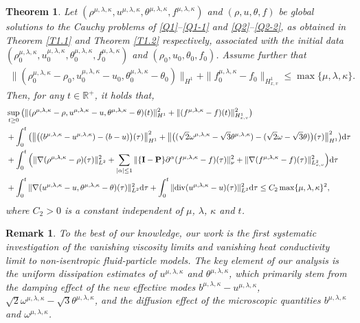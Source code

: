 \documentclass[reqno,11pt]{amsart}
\theoremstyle{plain}
\newtheorem{thm}{Theorem}[section]
\newtheorem{rem}{Remark}[section]
\numberwithin{equation}{section}
\begin{document}
\begin{thm}\label{T1.3}
Let $(\rho^{\mu,\lambda,\kappa}, u^{\mu,\lambda,\kappa}, \theta^{\mu,\lambda,\kappa}, 
f^{\mu,\lambda,\kappa})$ and $(\rho, u, \theta, f)$ 
be global solutions to the Cauchy problems of \eqref{Q1}--\eqref{Q1-1} and \eqref{Q2}--\eqref{Q2-2}, 
as obtained in
 Theorem \ref{T1.1} and Theorem \ref{T1.2}  respectively, associated with the initial data 
 $(\rho_0^{\mu,\lambda,\kappa}, 
 u_0^{\mu,\lambda,\kappa}, \theta_0^{\mu,
\lambda,\kappa}, f_0^{\mu,\lambda,\kappa})$ and $(\rho_0, u_0, \theta_0, f_0)$.
 Assume further that 
\begin{align}\nonumber %
\|(\rho_0^{\mu,\lambda,\kappa}-\rho_0,u_0^{\mu,\lambda,\kappa}-u_0,
\theta_0^{\mu,\lambda,\kappa}-\theta_0)\|_{H^1}+\|f_0^{\mu,\lambda,\kappa}-f_0\|_{H_{x,v}^1}\leq 
 \max\{\mu,\lambda,\kappa\}.
\end{align}
Then, for any $t\in \mathbb{R}^{+} $, it holds that,
\begin{align}\label{c2}
&\sup_{t\geq 0}\big(\|(\rho^ {\mu,\lambda,\kappa}-\rho,u^ {\mu,\lambda,\kappa}-u,
\theta^ {\mu,\lambda,\kappa}-\theta)(t)\|_{H^1}^2
+\|(f^ {\mu,\lambda,\kappa}-f)(t)\|_{H_{x,v}^1}^2\big)\nonumber\\
& +\int_0^t \big(\big\|\big((b^{\mu,\lambda,\kappa}-u^{\mu,\lambda,\kappa})-(b-u)\big)(\tau)\big\|_{H^1}^2 
 + \big\|\big((\sqrt{2}\omega^{\mu,\lambda,\kappa}-\sqrt{3}\theta^{\mu,\lambda,\kappa})
-(\sqrt{2}\omega-\sqrt{3}\theta)\big)(\tau)\big\|_{H^1}^2 \big){\rm d}\tau \nonumber\\
& +\int_0^t\Big( \|\nabla(\rho^{\mu,\lambda,\kappa}-\rho)(\tau)\|_{L^2}^2
+ \sum_{|\alpha|\leq 1}\|\{\mathbf{I}-\mathbf{P}\}\partial^\alpha 
(f^{\mu,\lambda,\kappa}-f)(\tau)\|_{\nu}^2
+\|\nabla (f^{\mu,\lambda,\kappa}-f)(\tau)\|_{L_{x,v}^2}^2\Big){\rm d}\tau\nonumber\\
&+\int_{0}^t \|\nabla (u^{\mu,\lambda,\kappa}-u,\theta^{\mu,\lambda,\kappa}
-\theta)(\tau)\|_{L^2}^2{\rm d}\tau+\int_0^t
 \|{\rm div}(u^{\mu,\lambda,\kappa}-u)(\tau)\|_{L^2}^2{\rm d}\tau  
  \leq  C_2  \max\{\mu,\lambda,\kappa\}^2,
\end{align}
where    $C_2>0$ is a constant independent of $\mu$, $\lambda$, $\kappa$ and    $t$. 
\end{thm}

\begin{rem} To the best of our knowledge, our work 
is the first systematic investigation of the vanishing
 viscosity limits and vanishing heat conductivity limit to
  non-isentropic fluid-particle models. The key element of our
  analysis is the uniform dissipation estimates of $u^{\mu,\lambda,\kappa}$ 
  and $\theta^{\mu,\lambda,\kappa}$, which primarily stem from the damping 
  effect of the new effective modes $b^{\mu,\lambda,\kappa}-u^{\mu,\lambda,\kappa}$, 
  $\sqrt{2}\omega^{\mu,\lambda,\kappa}-\sqrt{3}\theta^{\mu,\lambda,\kappa}$, and the 
diffusion effect of the microscopic quantities
 $b^{\mu,\lambda,\kappa}$ and $\omega^{\mu,\lambda,\kappa}$. 
\end{rem}
 
\end{document}
